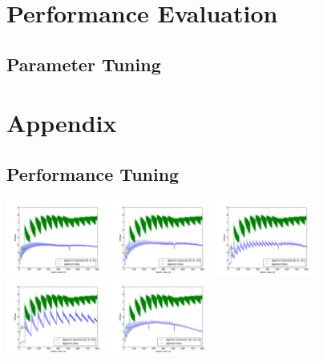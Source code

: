\documentclass[12pt]{article}
\begin{document}
\section{Performance Evaluation}
\subsection{Parameter Tuning}

\newpage
\section*{Appendix}
\subsection*{Performance Tuning}
	\includegraphics[width=0.25\textwidth]{graphs/profiles/PROFILE_OUTUT_8_8.pdf}  
	\includegraphics[width=0.25\textwidth]{graphs/profiles/PROFILE_OUTUT_8_16.pdf}  
	\includegraphics[width=0.25\textwidth]{graphs/profiles/PROFILE_OUTUT_8_32.pdf} 
	\includegraphics[width=0.25\textwidth]{graphs/profiles/PROFILE_OUTUT_8_64.pdf} 
	\includegraphics[width=0.25\textwidth]{graphs/profiles/PROFILE_OUTUT_16_8.pdf}  
\end{document}
